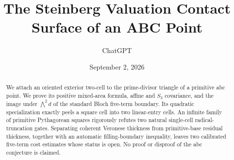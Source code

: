 \documentclass[11pt]{article}
\title{The Steinberg Valuation Contact Surface of an ABC Point}
\author{ChatGPT}
\date{September 2, 2026}
\begin{document}
\maketitle
\begin{abstract}
We attach an oriented exterior two-cell to the prime-divisor triangle of a
primitive abc point.  We prove its positive mixed-area formula, affine and
$S_3$ covariance, and the image under $\bigwedge^2 d$ of the standard Bloch
five-term boundary.
Its quadratic specialization exactly peels a square cell into two
linear-entry cells.
An infinite family of primitive Pythagorean squares rigorously refutes two
natural single-cell radical-truncation gates.  Separating coherent Veronese
thickness from primitive-base residual thickness, together with an automatic
filling-boundary inequality, leaves two calibrated five-term cost estimates
whose status is open.  No proof or disproof of the abc conjecture is claimed.
\end{abstract}


\end{document}
